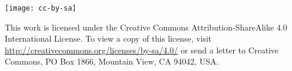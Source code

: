 
\thispagestyle{empty}

\vspace*{0.4\textheight}

\begin{center}
  \texttt{[image: cc-by-sa]}
\end{center}

\bigskip\noindent
This work is licensed under the Creative Commons Attribution-ShareAlike 4.0
International License. To view a copy of this license, visit
\url{http://creativecommons.org/licenses/by-sa/4.0/} or send a letter to
Creative Commons, PO Box 1866, Mountain View, CA 94042, USA.

\cleardoublepage
